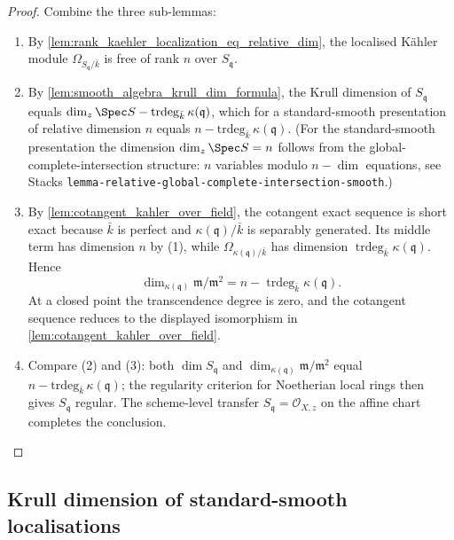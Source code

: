 \begin{proof}
  Combine the three sub-lemmas:
  \begin{enumerate}
    \item By \cref{lem:rank_kaehler_localization_eq_relative_dim},
      the localised K\"ahler module \(\Omega_{S_{\mathfrak q} / \bar k}\)
      is free of rank \(n\) over \(S_{\mathfrak q}\).
    \item By \cref{lem:smooth_algebra_krull_dim_formula}, the Krull dimension of
      \(S_{\mathfrak q}\) equals
      \(\dim_z \Spec S - \mathrm{trdeg}_{\bar k}\,\kappa(\mathfrak q)\),
      which for a standard-smooth presentation of relative dimension
      \(n\) equals \(n - \mathrm{trdeg}_{\bar k}\,\kappa(\mathfrak q)\).
      (For the standard-smooth presentation the dimension
      \(\dim_z \Spec S = n\) follows from the global-complete-intersection
      structure: \(n\) variables modulo \(n - \dim\) equations, see
      Stacks \texttt{lemma-relative-global-complete-intersection-smooth}.)
    \item By \cref{lem:cotangent_kahler_over_field}, the cotangent exact
      sequence is short exact because \(\bar k\) is perfect and
      \(\kappa(\mathfrak q)/\bar k\) is separably generated.  Its middle
      term has dimension \(n\) by (1), while
      \(\Omega_{\kappa(\mathfrak q)/\bar k}\) has dimension
      \(\operatorname{trdeg}_{\bar k}\kappa(\mathfrak q)\).  Hence
      \[
        \dim_{\kappa(\mathfrak q)}\mathfrak m/\mathfrak m^2
        =n-\operatorname{trdeg}_{\bar k}\kappa(\mathfrak q).
      \]
      At a closed point the transcendence degree is zero, and the
      cotangent sequence reduces to the displayed isomorphism in
      \cref{lem:cotangent_kahler_over_field}.
    \item Compare (2) and (3): both \(\dim S_{\mathfrak q}\) and
      \(\dim_{\kappa(\mathfrak q)} \mathfrak m / \mathfrak m^2\) equal
      \(n - \mathrm{trdeg}_{\bar k}\,\kappa(\mathfrak q)\); the
      regularity criterion for Noetherian local rings then gives \(S_{\mathfrak q}\)
      regular. The scheme-level transfer
      \(S_{\mathfrak q} = \mathcal O_{X, z}\) on the affine chart completes
      the conclusion.
  \end{enumerate}
\end{proof}

\subsection{Krull dimension of standard-smooth localisations}
\label{subsec:stage6_iib_substrate_iter200}


